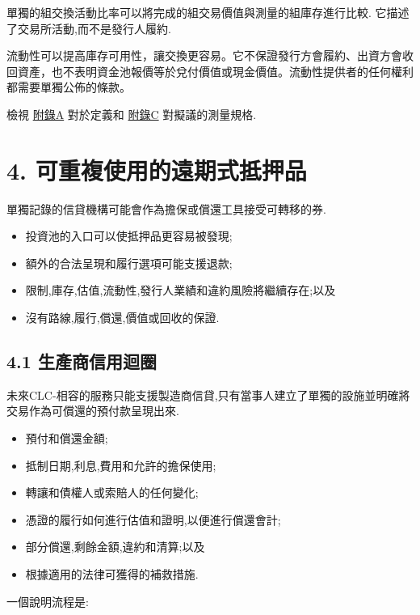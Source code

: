 \documentclass[11pt]{article}
\begin{document}
單獨的組交換活動比率可以將完成的組交易價值與測量的組庫存進行比較. 它描述了交易所活動,而不是發行人履約.

流動性可以提高庫存可用性，讓交換更容易。它不保證發行方會履約、出資方會收回資產，也不表明資金池報價等於兌付價值或現金價值。流動性提供者的任何權利都需要單獨公佈的條款。

檢視 \href{https://docs.cosmolocal.credit/zh-Hant/white-paper/appendix-a-math-box}{附錄A} 對於定義和 \href{https://docs.cosmolocal.credit/zh-Hant/white-paper/appendix-c-kpi-definitions}{附錄C} 對擬議的測量規格.


\section*{4. 可重複使用的遠期式抵押品}

單獨記錄的信貸機構可能會作為擔保或償還工具接受可轉移的券.

\begin{itemize}[leftmargin=*]
\item 投資池的入口可以使抵押品更容易被發現;
\item 額外的合法呈現和履行選項可能支援退款;
\item 限制,庫存,估值,流動性,發行人業績和違約風險將繼續存在;以及
\item 沒有路線,履行,償還,價值或回收的保證.
\end{itemize}
\subsection*{4.1 生產商信用迴圈}

未來CLC-相容的服務只能支援製造商信貸,只有當事人建立了單獨的設施並明確將交易作為可償還的預付款呈現出來.

\begin{itemize}[leftmargin=*]
\item 預付和償還金額;
\item 抵制日期,利息,費用和允許的擔保使用;
\item 轉讓和債權人或索賠人的任何變化;
\item 憑證的履行如何進行估值和證明,以便進行償還會計;
\item 部分償還,剩餘金額,違約和清算;以及
\item 根據適用的法律可獲得的補救措施.
\end{itemize}
一個說明流程是:
\end{document}
